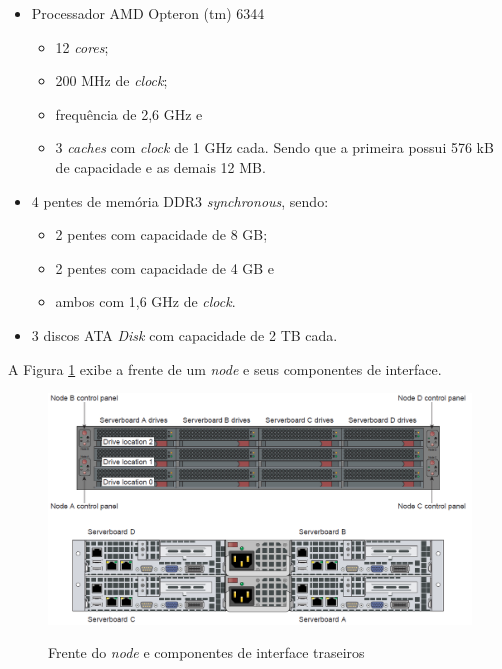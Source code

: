     \begin{itemize}
    
    \item Processador AMD Opteron (tm) 6344
    
        \begin{itemize}
        \item 12 \textit{cores};
        \item 200 MHz de \textit{clock};
        \item frequência de 2,6 GHz e
        \item 3 \textit{caches} com \textit{clock} de 1 GHz cada. Sendo que a primeira possui 576 kB de capacidade e as demais 12 MB.
        \end{itemize}
        
    \item 4 pentes de memória DDR3 \textit{synchronous}, sendo:
        
        \begin{itemize}
        \item 2 pentes com capacidade de 8 GB;
        \item 2 pentes com capacidade de 4 GB e
        \item ambos com 1,6 GHz de \textit{clock}.
        \end{itemize}

    \item 3 discos ATA \textit{Disk} com capacidade de 2 TB cada.

    \end{itemize}
    
    A Figura \ref{fig:node} exibe a frente de um \textit{node} e seus componentes de interface.
    
     \begin{figure}[htb]
    \centering
    \includegraphics[scale=0.50]{imagens/node.png}
    \caption{Frente do \textit{node} e componentes de interface traseiros} \cite{SGI2011i}
    \label{fig:node}
    \end{figure}   
    

